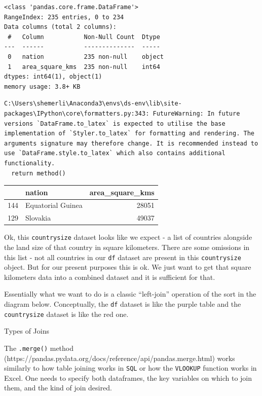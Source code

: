 \documentclass[
  letterpaper,
  DIV=11,
  numbers=noendperiod]{scrreprt}
\begin{document}
\begin{verbatim}
<class 'pandas.core.frame.DataFrame'>
RangeIndex: 235 entries, 0 to 234
Data columns (total 2 columns):
 #   Column           Non-Null Count  Dtype 
---  ------           --------------  ----- 
 0   nation           235 non-null    object
 1   area_square_kms  235 non-null    int64 
dtypes: int64(1), object(1)
memory usage: 3.8+ KB
\end{verbatim}

\begin{verbatim}
C:\Users\shemerli\Anaconda3\envs\ds-env\lib\site-packages\IPython\core\formatters.py:343: FutureWarning: In future versions `DataFrame.to_latex` is expected to utilise the base implementation of `Styler.to_latex` for formatting and rendering. The arguments signature may therefore change. It is recommended instead to use `DataFrame.style.to_latex` which also contains additional functionality.
  return method()
\end{verbatim}

\begin{tabular}{llr}
\toprule
{} &             nation &  area\_square\_kms \\
\midrule
144 &  Equatorial Guinea &            28051 \\
129 &           Slovakia &            49037 \\
\bottomrule
\end{tabular}

Ok, this \texttt{countrysize} dataset looks like we expect - a list of
countries alongside the land size of that country in square kilometers.
There are some omissions in this list - not all countries in our
\texttt{df} dataset are present in this \texttt{countrysize} object. But
for our present purposes this is ok. We just want to get that square
kilometers data into a combined dataset and it is sufficient for that.

Essentially what we want to do is a classic ``left-join'' operation of
the sort in the diagram below. Conceptually, the \texttt{df} dataset is
like the purple table and the \texttt{countrysize} dataset is like the
red one.

Types of Joins

The \texttt{.merge()} method
(https://pandas.pydata.org/docs/reference/api/pandas.merge.html) works
similarly to how table joining works in \texttt{SQL} or how the
\texttt{VLOOKUP} function works in Excel. One needs to specify both
dataframes, the key variables on which to join them, and the kind of
join desired.
\end{document}
